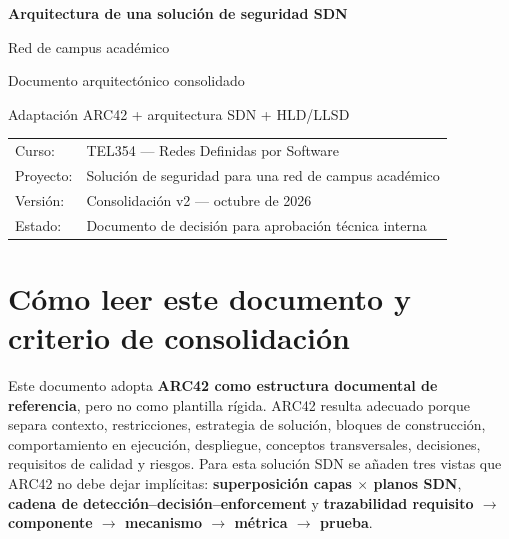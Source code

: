 \documentclass[11pt,a4paper]{article}
\begin{document}
\begin{titlepage}
\centering
\vspace*{1.5cm}
{\Huge\bfseries Arquitectura de una solución de seguridad SDN\par}
\vspace{0.35cm}
{\LARGE Red de campus académico\par}
\vspace{1.2cm}
{\Large Documento arquitectónico consolidado\par}
\vspace{0.8cm}
{\large Adaptación ARC42 + arquitectura SDN + HLD/LLSD\par}
\vfill
\begin{tabular}{ll}
Curso: & TEL354 --- Redes Definidas por Software\\
Proyecto: & Solución de seguridad para una red de campus académico\\
Versión: & Consolidación v2 --- octubre de 2026\\
Estado: & Documento de decisión para aprobación técnica interna\\
\end{tabular}
\vfill
{}
\vfill
\end{titlepage}

\tableofcontents
\newpage

\section{Cómo leer este documento y criterio de consolidación}

Este documento adopta \textbf{ARC42 como estructura documental de referencia}, pero no como plantilla rígida. ARC42 resulta adecuado porque separa contexto, restricciones, estrategia de solución, bloques de construcción, comportamiento en ejecución, despliegue, conceptos transversales, decisiones, requisitos de calidad y riesgos. Para esta solución SDN se añaden tres vistas que ARC42 no debe dejar implícitas: \textbf{superposición capas $\times$ planos SDN}, \textbf{cadena de detección--decisión--enforcement} y \textbf{trazabilidad requisito \(\rightarrow\) componente \(\rightarrow\) mecanismo \(\rightarrow\) métrica \(\rightarrow\) prueba}.
\end{document}
